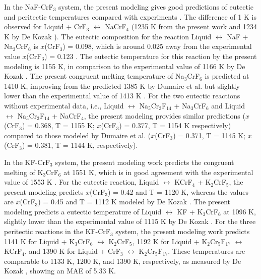 In the NaF-CrF$_3$ system, the present modeling gives good predictions of eutectic and peritectic temperatures compared with experiments \cite{DeKozak1969}. The difference of 1 K is observed for Liquid + CrF$_3$ $\leftrightarrow$ NaCrF$_4$ (1235 K from the present work and 1234 K by De Kozak \cite{DeKozak1969}). The eutectic composition for the reaction Liquid $\leftrightarrow$ NaF + Na$_3$CrF$_6$ is $x$(CrF$_3$) = 0.098, which is around 0.025 away from the experimental value $x$(CrF$_3$) = 0.123 \cite{DeKozak1969}. The eutectic temperature for this reaction by the present modeling is 1155 K, in comparison to the experimental value of 1166 K by De Kozak \cite{DeKozak1969}. The present congruent melting temperature of Na$_3$CrF$_6$ is predicted at 1410 K, improving from the predicted 1385 K by Dumaire et al. \cite{dumaire2021thermodynamic} but slightly lower than the experimental value of 1413 K \cite{DeKozak1969}. For the two eutectic reactions without experimental data, i.e., Liquid $\leftrightarrow$ Na$_5$Cr$_3$F$_{14}$ + Na$_3$CrF$_6$ and Liquid $\leftrightarrow$ Na$_5$Cr$_3$F$_{14}$ + NaCrF$_4$, the present modeling provides similar predictions ($x$(CrF$_3$) = 0.368, T = 1155 K; $x$(CrF$_3$) = 0.377, T = 1154 K respectively) compared to those modeled by Dumaire et al. \cite{dumaire2021thermodynamic} ($x$(CrF$_3$) = 0.371, T = 1145 K; $x$(CrF$_3$) = 0.381, T = 1144 K, respectively). 

In the KF-CrF$_3$ system, the present modeling work predicts the congruent melting of K$_3$CrF$_6$ at 1551 K, which is in good agreement with the experimental value of 1553 K \cite{DeKozak1969}. For the eutectic reaction, Liquid $\leftrightarrow$ KCrF$_4$ + K$_2$CrF$_5$, the present modeling predicts $x$(CrF$_3$) = 0.42 and T = 1120 K, whereas the values are $x$(CrF$_3$) = 0.45 and T = 1112 K modeled by De Kozak \cite{DeKozak1969}. The present modeling predicts a eutectic temperature of Liquid $\leftrightarrow$ KF + K$_3$CrF$_6$ at 1096 K, slightly lower than the experimental value of 1115 K by De Kozak \cite{DeKozak1969}. For the three peritectic reactions in the KF-CrF$_3$ system, the present modeling work predicts 1141 K for Liquid + K$_3$CrF$_6$ $\leftrightarrow$ K$_2$CrF$_5$, 1192 K for Liquid + K$_2$Cr$_5$F$_{17}$ $\leftrightarrow$ KCrF$_4$, and 1390 K for Liquid + CrF$_3$ $\leftrightarrow$ K$_2$Cr$_5$F$_{17}$. These temperatures are comparable to 1133 K, 1200 K, and 1390 K, respectively, as measured by De Kozak \cite{DeKozak1969}, showing an MAE of 5.33 K.

